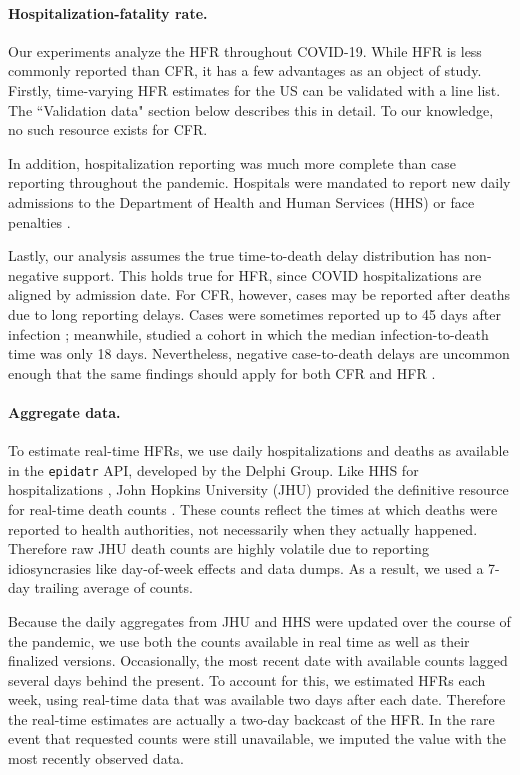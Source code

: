 \documentclass{article}
\begin{document}
\paragraph{Hospitalization-fatality rate.}
Our experiments analyze the HFR throughout COVID-19. 
While HFR is less commonly reported than CFR, it has a few advantages as an object of study.
Firstly, time-varying HFR estimates for the US can be validated with a line list. The ``Validation data" section below describes this in detail. To our knowledge, no such resource exists for CFR. 

In addition, hospitalization reporting was much more complete than case reporting throughout the pandemic. Hospitals were mandated to report new daily admissions to the Department of Health and Human Services (HHS) or face penalties \citep{HHS2023}. 

Lastly, our analysis assumes the true time-to-death delay distribution has non-negative support. This holds true for HFR, since COVID hospitalizations are aligned by admission date. 
For CFR, however, cases may be reported after deaths due to long reporting delays. 
Cases were sometimes reported up to 45 days after infection \citep{Jahja2022}; meanwhile, \citet{Lancet_delays} studied a cohort in which the median infection-to-death time was only 18 days.
Nevertheless, negative case-to-death delays are uncommon enough that the same findings should apply for both CFR and HFR \citet{nishiuraEx2, UKdelay}.

\paragraph{Aggregate data.}
To estimate real-time HFRs, we use daily hospitalizations and deaths as
available in
the \texttt{epidatr} API, developed by the Delphi Group. Like HHS for
hospitalizations \citep{HHS2023}, John Hopkins University (JHU) provided the
definitive resource for real-time death counts \citep{JHUepidatr}. These counts
reflect the times at which deaths were reported to health authorities, not
necessarily when they actually happened. Therefore raw JHU death counts are
highly volatile due to reporting idiosyncrasies like day-of-week effects and
data dumps. As a result, we used a 7-day trailing average of counts. 

Because the daily aggregates from JHU and HHS were updated over the course of
the pandemic, we use both the counts available in real time as well as their
finalized versions. Occasionally, the most recent date with available counts
lagged several days behind the present. To account for this, we estimated HFRs
each week, using real-time data that was available two days after each date. 
Therefore the real-time estimates are actually a two-day backcast of the HFR.
In the rare event that requested counts were still unavailable, we imputed the
value with the most recently observed data. 
\end{document}
